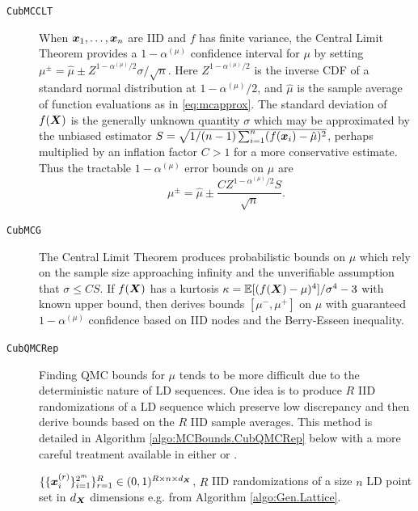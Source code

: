 \documentclass{article}[12pt]
\begin{document}
\begin{description}
    \item[\texttt{CubMCCLT}] When $\boldsymbol{x}_1,\dots,\boldsymbol{x}_n$ are IID and $f$ has finite variance, the Central Limit Theorem provides a $1-\alpha^{(\mu)}$ confidence interval for $\mu$ by setting $\mu^\pm = \hat{\mu} \pm Z^{1-\alpha^{(\mu)}/2}\sigma/\sqrt{n}$. Here $Z^{1-\alpha^{(\mu)}/2}$ is the inverse CDF of a standard normal distribution at $1-\alpha^{(\mu)}/2$, and $\hat{\mu}$ is the sample average of function evaluations as in \eqref{eq:mcapprox}. The standard deviation of $f(\boldsymbol{X})$ is the generally unknown quantity $\sigma$ which may be approximated by the unbiased estimator $S = \sqrt{1/(n-1)\sum_{i=1}^n(f(\boldsymbol{x}_i)-\hat{\mu})^2}$, perhaps multiplied by an inflation factor $C>1$ for a more conservative estimate. Thus the tractable $1-\alpha^{(\mu)}$ error bounds on $\mu$ are
    \begin{equation*}
        \mu^\pm = \hat{\mu} \pm \frac{CZ^{1-\alpha^{(\mu)}/2}S}{\sqrt{n}}
        \label{eq:clt_mu_bounds}.
    \end{equation*}
    \item[\texttt{CubMCG}] The Central Limit Theorem produces probabilistic bounds on $\mu$ which rely on the sample size approaching infinity and the unverifiable assumption that $\sigma \leq CS$. If $f(\boldsymbol{X})$ has a kurtosis $\kappa = \mathbb{E}[(f(\boldsymbol{X})-\mu)^4]/\sigma^4-3$ with known upper bound, then   \cite{cubmcg} derives bounds $[\mu^-,\mu^+]$ on $\mu$ with guaranteed $1-\alpha^{(\mu)}$ confidence based on IID nodes and the Berry-Esseen inequality.
    \item[\texttt{CubQMCRep}] Finding QMC bounds for $\mu$ tends to be more difficult due to the deterministic nature of LD sequences. One idea is to produce $R$ IID randomizations of a LD sequence which preserve low discrepancy and then derive bounds based on the $R$ IID sample averages. This method is detailed in Algorithm \ref{algo:MCBounds.CubQMCRep} below with a more careful treatment available in either \cite[Chapter 17]{mcbook} or \cite{qmc4pde_preprint}. \begin{algorithm}[h!]
        \caption{$\texttt{MCBounds.CubQMCRep}\left(\{\{\bx_i^{(r)}\}_{i=1}^n\}_{r=1}^R, \{\{y_i^{(r)}\}_{i=1}^n\}_{r=1}^R, \alpha^{(\mu)}\right)$}
        \label{algo:MCBounds.CubQMCRep}
        \begin{algorithmic}
        \Require $\{\{\boldsymbol{x}_i^{(r)}\}_{i=1}^{2^m}\}_{r=1}^R \in (0,1)^{R \times n \times d_{\boldsymbol{X}}}$, $R$ IID randomizations of a size $n$ LD point set in $d_{\boldsymbol{X}}$ dimensions e.g. from Algorithm \ref{algo:Gen.Lattice}.

\end{algorithmic}
\end{algorithm}
\end{description}
\end{document}
